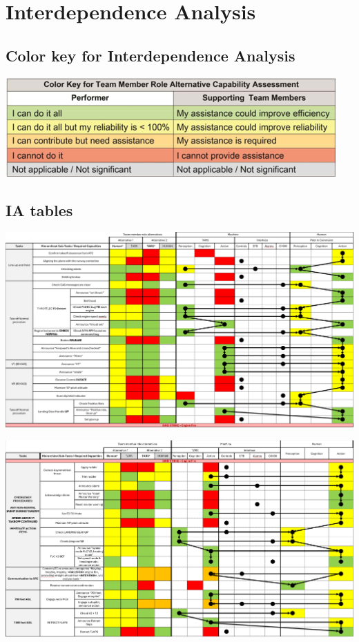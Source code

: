 \documentclass[12pt,a4paper]{article} %
\begin{document}
	\section{Interdependence Analysis}
	\label{appendix:IA}

	\subsection{Color key for Interdependence Analysis}

	\begin{table}[H]
		\centering
		\includegraphics{images/color_key_IA.png}
		\label{table:color-key}
	\end{table}

	\subsection{IA tables}
	\label{table:all-IA}

	\begin{table}[H]
		\centering
		\includegraphics[width=1\textwidth]{images/IA-table-1.png}
	\end{table}

	\begin{table}[H]
		\centering
		\includegraphics[width=1\textwidth]{images/IA-table-2.png}
	\end{table}
\end{document}
